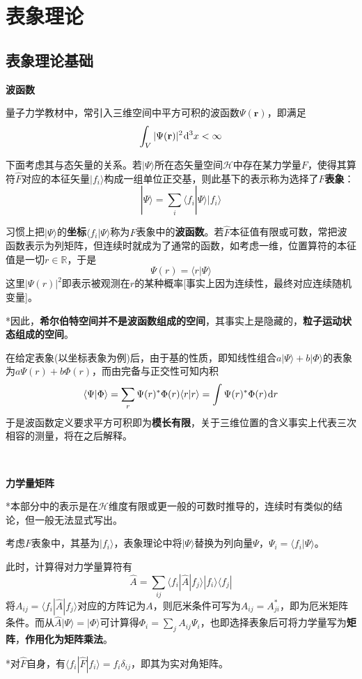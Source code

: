 \documentclass[a4paper,UTF8,fontset=windows]{ctexart}
\newcommand*{\dr}{\hspace{0.07em}\mathrm{d}}
\newcommand*{\ket}[1]{|#1\rangle}
\newcommand*{\bra}[1]{\langle#1|}
\newcommand*{\bk}[2]{\langle#1|#2\rangle}
\newcommand*{\blk}[3]{\langle#1|#2|#3\rangle}
\begin{document}
\section{表象理论}
\subsection{表象理论基础}
\textbf{波函数}

量子力学教材中，常引入三维空间中平方可积的波函数$\Psi(\mathbf{r})$，即满足
$$\int_V|\Psi(\mathbf{r})|^2\dr^3x<\infty$$

下面考虑其与态矢量的关系。若$\ket{\Psi}$所在态矢量空间$\mathcal{H}$中存在某力学量$F$，使得其算符$\hat{F}$对应的本征矢量$\ket{f_i}$构成一组单位正交基，则此基下的表示称为选择了$F$\textbf{表象}：
$$\ket{\Psi}=\sum_i\bk{f_i}{\Psi}\ket{f_i}$$

习惯上把$\ket{\Psi}$的\textbf{坐标}$\bk{f_i}{\Psi}$称为$F$表象中的\textbf{波函数}。若$\hat{F}$本征值有限或可数，常把波函数表示为列矩阵，但连续时就成为了通常的函数，如考虑一维，位置算符的本征值是一切$r\in\mathbb{R}$，于是
$$\Psi(r)=\bk{r}{\Psi}$$
这里$|\Psi(r)|^2$即表示被观测在$r$的某种概率[事实上因为连续性，最终对应连续随机变量]。

*因此，\textbf{希尔伯特空间并不是波函数组成的空间}，其事实上是隐藏的，\textbf{粒子运动状态组成的空间}。

在给定表象(以坐标表象为例)后，由于基的性质，即知线性组合$a\ket{\Psi}+b\ket{\Phi}$的表象为$a\Psi(r)+b\Phi(r)$，而由完备与正交性可知内积
$$\bk{\Psi}{\Phi}=\sum_r\Psi(r)^*\Phi(r)\bk{r}{r}=\int\Psi(r)^*\Phi(r)\dr r$$
于是波函数定义要求平方可积即为\textbf{模长有限}，关于三维位置的含义事实上代表三次相容的测量，将在之后解释。

\

\textbf{力学量矩阵}

*本部分中的表示是在$\mathcal{H}$维度有限或更一般的可数时推导的，连续时有类似的结论，但一般无法显式写出。

考虑$F$表象中，其基为$\ket{f_i}$，表象理论中将$\ket{\Psi}$替换为列向量$\Psi$，$\Psi_i=\bk{f_i}{\Psi}$。

此时，计算得对力学量算符有
$$\hat{A}=\sum_{ij}\blk{f_i}{\hat{A}}{f_j}\ket{f_i}\bra{f_j}$$
将$A_{ij}=\blk{f_i}{\hat{A}}{f_j}$对应的方阵记为$A$，则厄米条件可写为$A_{ij}=A_{ji}^*$，即为厄米矩阵条件。而从$\hat{A}\ket{\Psi}=\ket{\Phi}$可计算得$\Phi_i=\sum_jA_{ij}\Psi_i$，也即选择表象后可将力学量写为\textbf{矩阵}，\textbf{作用化为矩阵乘法}。

*对$\hat{F}$自身，有$\blk{f_i}{\hat{F}}{f_i}=f_i\delta_{ij}$，即其为实对角矩阵。
\end{document}
